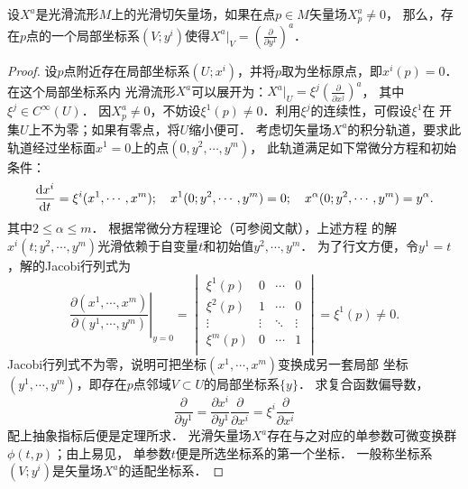 \begin{theorem}\label{chdm:thm_1PDG-ppy}
    设$X^a$是光滑流形$M$上的光滑切矢量场，如果在点$p \in M$矢量场$X^a_p \neq 0$，
    那么，存在$p$点的一个局部坐标系$(V;y^i)$使得$X^a |_V = (\frac{\partial }{\partial y^1} )^a$．
\end{theorem}
\begin{proof}
    设$p$点附近存在局部坐标系$(U;x^i)$，并将$p$取为坐标原点，即$x^i(p)=0$．在这个局部坐标系内
    光滑流形$X^a$可以展开为：$ X^a |_U = \xi^ j (\frac{\partial }{\partial x^j} )^a$，
    其中 $\xi^ j \in C^\infty(U)$．
    因$X^a_p \neq 0$，不妨设$\xi^1(p)\neq 0$．利用$\xi^j$的连续性，可假设$\xi^1$在
    开集$U$上不为零；如果有零点，将$U$缩小便可．
    考虑切矢量场$X^a$的积分轨道，要求此轨道经过坐标面$x^1=0$上的点$(0,y^2,\cdots,y^m)$，
    此轨道满足如下常微分方程和初始条件：
    \begin{equation*}
        \frac{{\rm d} x^i}{{\rm d} t} = \xi^i (x^1,\cdots,x^m); \quad
        x^1(0;y^2,\cdots,y^m) = 0; \quad
        x^\alpha(0;y^2,\cdots,y^m) = y^\alpha.
    \end{equation*}
    其中$2 \leqslant \alpha \leqslant m$．
    根据常微分方程理论（可参阅文献\parencite[\S 31]{arnold-2001-ode}），上述方程
    的解$x^i(t;y^2,\cdots,y^m)$光滑依赖于自变量$t$和初始值$y^2,\cdots,y^m$．
    为了行文方便，令$y^1=t$，解的Jacobi行列式为
    \begin{equation*}
        \left. \frac{\partial (x^1,\cdots,x^m)}{\partial (y^1,\cdots,y^m)} \right|_{y=0}=
        \begin{vmatrix}
            \xi^1(p) & 0 &\cdots & 0 \\
            \xi^2(p) & 1 &\cdots & 0 \\
            \vdots   & \vdots &\ddots & \vdots \\
            \xi^m(p) & 0 &\cdots & 1 \\
        \end{vmatrix}
        = \xi^1(p) \neq 0.
    \end{equation*}
    Jacobi行列式不为零，说明可把坐标$(x^1,\cdots,x^m)$变换成另一套局部
    坐标$(y^1,\cdots,y^m)$，即存在$p$点邻域$V\subset U$的局部坐标系$\{y\}$．
    求复合函数偏导数，
    \begin{equation*}
        \frac{\partial}{\partial y^1} = \frac{\partial x^i}{\partial y^1} \frac{\partial}{\partial x^i}
        = \xi^i \frac{\partial}{\partial x^i}
    \end{equation*}
    配上抽象指标后便是定理所求．
    光滑矢量场$X^a$存在与之对应的单参数可微变换群$\phi(t,p)$；由上易见，
    单参数$t$便是所选坐标系的第一个坐标．
    一般称坐标系$(V;y^i)$是矢量场$X^a$的{\heiti 适配坐标系}． 
\end{proof}



